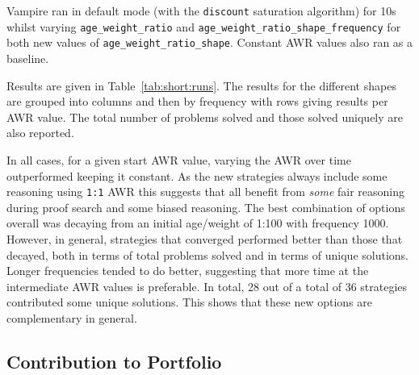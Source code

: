 \documentclass{llncs}
\begin{document}
Vampire ran in default mode (with the \texttt{discount} saturation algorithm) for 10s whilst varying  \texttt{age\_weight\_ratio} and \texttt{age\_weight\_ratio\_shape\_frequency} for both new values of \texttt{age\_weight\_ratio\_shape}.
Constant AWR values also ran as a baseline. 

Results are given in Table~\ref{tab:short:runs}.
The results for the different shapes are grouped into columns and then by frequency with rows giving results per AWR value.
The total number of problems solved and those solved uniquely are also reported.

In all cases, for a given start AWR value, varying the AWR over time outperformed keeping it constant. As the new strategies always include some reasoning using \verb|1:1| AWR this suggests that all benefit from \emph{some} fair reasoning during proof search and some biased reasoning. 
The best combination of options overall was decaying from an initial age/weight of 1:100 with frequency 1000.
However, in general, strategies that converged performed better than those that decayed, both in terms of total problems solved and in terms of unique solutions. 
Longer frequencies tended to do better, suggesting that more time at the intermediate AWR values is preferable. 
In total, 28 out of a total of 36 strategies contributed some unique solutions. This shows that these new options are complementary in general.

\subsection{Contribution to Portfolio}
\end{document}
